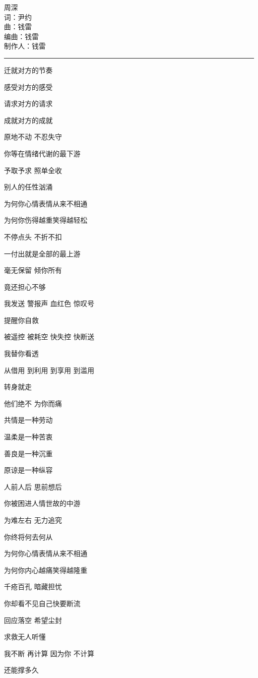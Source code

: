 \documentclass[]{ctexbook}
\begin{document}
周深\\
词：尹约\\
曲：钱雷\\
编曲：钱雷\\
制作人：钱雷

\begin{center}\rule{0.5\linewidth}{0.5pt}\end{center}

迁就对方的节奏

感受对方的感受

请求对方的请求

成就对方的成就

原地不动 不忍失守

你等在情绪代谢的最下游

予取予求 照单全收

别人的任性汹涌

为何你心情表情从来不相通

为何你伤得越重笑得越轻松

不停点头 不折不扣

一付出就是全部的最上游

毫无保留 倾你所有

竟还担心不够

我发送 警报声 血红色 惊叹号

提醒你自救

被遥控 被耗空 快失控 快断送

我替你看透

从借用 到利用 到享用 到滥用

转身就走

他们绝不 为你而痛

共情是一种劳动

温柔是一种苦衷

善良是一种沉重

原谅是一种纵容

人前人后 思前想后

你被困进人情世故的中游

为难左右 无力追究

你终将何去何从

为何你心情表情从来不相通

为何你内心越痛笑得越隆重

千疮百孔 暗藏担忧

你却看不见自己快要断流

回应落空 希望尘封

求救无人听懂

我不断 再计算 因为你 不计算

还能撑多久
\end{document}
